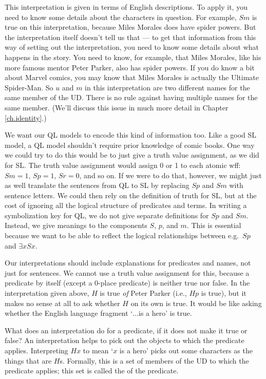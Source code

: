 This interpretation is given in terms of English descriptions. To apply it, you need to know some details about the characters in question. For example, $Sm$ is true on this interpretation, because Miles Morales does have spider powers. But the interpretation itself doesn't tell us that --- to get that information from this way of setting out the interpretation, you need to know some details about what happens in the story. You need to know, for example, that Miles Morales, like his more famous mentor Peter Parker, also has spider powers. If you do know a bit about Marvel comics, you may know that Miles Morales is actually the Ultimate Spider-Man. So $u$ and $m$ in this interpretation are two different names for the same member of the UD. There is no rule against having multiple names for the same member. (We'll discuss this issue in much more detail in Chapter \ref{ch.identity}.)

We want our QL models to encode this kind of information too. Like a good SL model, a QL model shouldn't require prior knowledge of comic books. One way we could try to do this would be to just give a truth value assignment, as we did for SL. The truth value assignment would assign 0 or 1 to each atomic wff: $Sm=1$, $Sp=1$, $Sr=0$, and so on. If we were to do that, however, we might just as well translate the sentences from QL to SL by replacing $Sp$ and $Sm$ with sentence letters. We could then rely on the definition of truth for SL, but at the cost of ignoring all the logical structure of predicates and terms. In writing a symbolization key for QL, we do not give separate definitions for $Sp$ and $Sm$. Instead, we give meanings to the components $S$, $p$, and $m$. This is essential because we want to be able to reflect the logical relationships between e.g.\ $Sp$ and $\exists x Sx$.

Our interpretations should include explanations for predicates and names, not just for sentences. We cannot use a truth value assignment for this, because a predicate by itself (except a 0-place predicate) is neither true nor false. In the interpretation given above, $H$ is true \emph{of} Peter Parker (i.e., $Hp$ is true), but it makes no sense at all to ask whether $H$ on its own is true. It would be like asking whether the English language fragment `$\ldots$is a hero' is true.

What does an interpretation do for a predicate, if it does not make it true or false? An interpretation helps to pick out the objects to which the predicate applies. Interpreting $Hx$ to mean `$x$ is a hero' picks out some characters as the things that are $H$s. Formally, this is a set of members of the UD to which the predicate applies; this set is called the  of the predicate.

